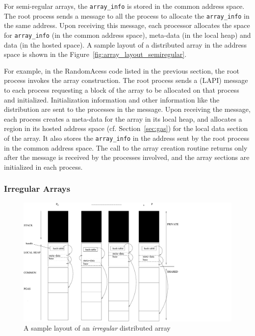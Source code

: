 For semi-regular arrays, the
{\tt array\_info} is stored in the common address space. The root process
sends a message to all the process to allocate the {\tt array\_info}
in the same address. Upon receiving this message, each processor
allocates the space for {\tt array\_info} (in the common address space), meta-data 
(in the local heap) and data (in the hosted space). A sample layout of a
distributed array in the address space is shown in the Figure~\ref{fig:array_layout_semiregular}.

For example, in the RandomAcess code listed in the previous section, the root process
invokes the array construction. The root process sends
a (LAPI) message to each process requesting a block of the array to be allocated
on that process and initialized. Initialization information and other information like the distribution are sent to the
processes in the message. 
Upon receiving the message, each process creates a meta-data for the array
in its local heap, and allocates a region in its hosted address space (cf. Section~\ref{sec:gas})
for the local data section of the array. It also stores the {\tt array\_info}
in the address sent by the root process in the common address space. 
The call to the array creation routine returns only after the message
is received by the processes involved, and the array sections are initialized
in each process. 

\subsubsection{Irregular Arrays}

\begin{figure}
\center
\includegraphics[scale=0.5]{figs/ARRAY-IRREGULAR.pdf}
\caption{A sample layout of an {\em irregular} distributed array}
\label{fig:array_layout_irregular}
\end{figure}

